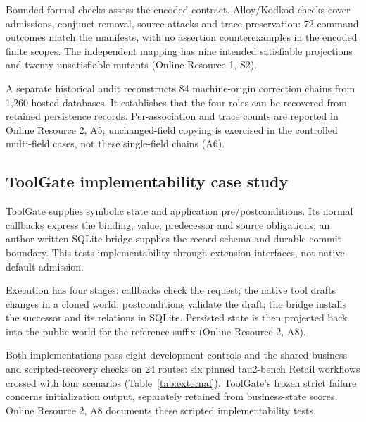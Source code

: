 \documentclass[pdflatex,sn-basic]{sn-jnl}
\begin{document}
Bounded formal checks assess the encoded contract. Alloy/Kodkod checks \citep{alloy,kodkod} cover admissions, conjunct removal, source attacks and trace preservation: 72 command outcomes match the manifests, with no assertion counterexamples in the encoded finite scopes. The independent mapping has nine intended satisfiable projections and twenty unsatisfiable mutants (Online Resource 1, S2).

A separate historical audit reconstructs 84 machine-origin correction chains from 1,260 hosted databases. It establishes that the four roles can be recovered from retained persistence records. Per-association and trace counts are reported in Online Resource 2, A5; unchanged-field copying is exercised in the controlled multi-field cases, not these single-field chains (A6).

\subsection{ToolGate implementability case study}\label{configured-toolgate-on-public-reference-workflows}

ToolGate \citep{toolgate} supplies symbolic state and application pre/postconditions. Its normal callbacks express the binding, value, predecessor and source obligations; an author-written SQLite bridge supplies the record schema and durable commit boundary. This tests implementability through extension interfaces, not native default admission.

Execution has four stages: callbacks check the request; the native tool drafts changes in a cloned world; postconditions validate the draft; the bridge installs the successor and its relations in SQLite. Persisted state is then projected back into the public world for the reference suffix (Online Resource 2, A8).

Both implementations pass eight development controls and the shared business and scripted-recovery checks on 24 routes: six pinned tau2-bench Retail workflows \citep{tau2-bench} crossed with four scenarios (Table~\ref{tab:external}). ToolGate's frozen strict failure concerns initialization output, separately retained from business-state scores. Online Resource 2, A8 documents these scripted implementability tests.
\end{document}
